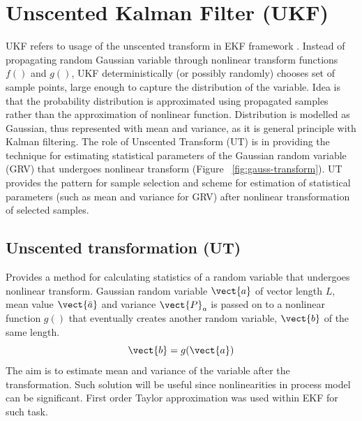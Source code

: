 \section{Unscented Kalman Filter (UKF)}\label{sec:ukf}
UKF refers to usage of the unscented transform in EKF framework \cite{julier00, wan00, ristic04}. Instead of propagating random Gaussian variable through nonlinear transform functions $f()$ and $g()$, UKF deterministically (or possibly randomly) chooses set of sample points, large enough to capture the distribution of the variable. Idea is that the probability distribution is approximated using propagated samples rather than the approximation of nonlinear function. Distribution is modelled as Gaussian, thus represented with mean and variance, as it is general principle with Kalman filtering. The role of Unscented Transform (UT) is in providing the technique for estimating statistical parameters of the Gaussian random variable (GRV) that undergoes nonlinear transform (Figure ~\ref{fig:gauss-transform}). UT provides the pattern for sample selection and scheme for estimation of statistical parameters (such as mean and variance for GRV) after nonlinear transformation of selected samples.
\subsection{Unscented transformation (UT)}
Provides a method for calculating statistics of a random variable that undergoes nonlinear transform. Gaussian random variable $\vect{a}$ of vector length $L$, mean value $\vect{\bar{a}}$ and variance $\vect{P}_{a}$ is passed on to a nonlinear function $g()$ that eventually creates another random variable, $\vect{b}$ of the same length.
$$ \vect{b} = g(\vect{a}) $$   
The aim is to estimate mean and variance of the variable after the transformation. Such solution will be useful since nonlinearities in process model can be significant. First order Taylor approximation was used within EKF for such task.

